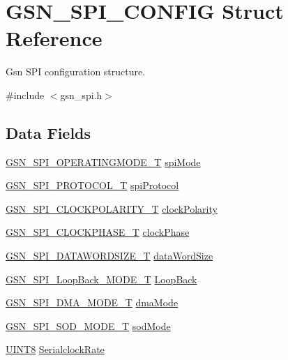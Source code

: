 \hypertarget{a00231}{
\section{GSN\_\-SPI\_\-CONFIG Struct Reference}
\label{a00231}
}


Gsn SPI configuration structure.  




{\ttfamily \#include $<$gsn\_\-spi.h$>$}

\subsection*{Data Fields}
\begin{DoxyCompactItemize}
\item 
\hyperlink{a00655_ga6621383791d81630bc4c294a7a3d292d}{GSN\_\-SPI\_\-OPERATINGMODE\_\-T} \hyperlink{a00231_ab1f5bd9a03dacfe8a653d9cc61bcf820}{spiMode}
\item 
\hyperlink{a00655_gafc404344d5f8c6a8358fa3be07a87444}{GSN\_\-SPI\_\-PROTOCOL\_\-T} \hyperlink{a00231_a2cc829f36d85f4ba9500b54e9a74b0d3}{spiProtocol}
\item 
\hyperlink{a00655_ga40c914db809ec79fd3a564dda8364aea}{GSN\_\-SPI\_\-CLOCKPOLARITY\_\-T} \hyperlink{a00231_a2fcdd63ffc7b77384ef779ac2bc097f3}{clockPolarity}
\item 
\hyperlink{a00655_ga1399b803d30956e8ed6f4929033329ad}{GSN\_\-SPI\_\-CLOCKPHASE\_\-T} \hyperlink{a00231_a3bf64950c4cb62575d5cc62ca7f0c477}{clockPhase}
\item 
\hyperlink{a00655_ga63cbe81427185213bde26b93dde72747}{GSN\_\-SPI\_\-DATAWORDSIZE\_\-T} \hyperlink{a00231_a3998333a3ec939733a315371ea525299}{dataWordSize}
\item 
\hyperlink{a00655_ga6f83091cbd86860cdb531eb6c520660e}{GSN\_\-SPI\_\-LoopBack\_\-MODE\_\-T} \hyperlink{a00231_a82d6f7f94ead0563d493532a0fc8082e}{LoopBack}
\item 
\hyperlink{a00655_gafff743b26bbfafb380a9797457935a0e}{GSN\_\-SPI\_\-DMA\_\-MODE\_\-T} \hyperlink{a00231_a8745e343cad523631d63304871d0bdf3}{dmaMode}
\item 
\hyperlink{a00655_ga5662413f1ff6b81e835e7c5412916d4b}{GSN\_\-SPI\_\-SOD\_\-MODE\_\-T} \hyperlink{a00231_a6988180f451df73a4220e1f4df6c37d9}{sodMode}
\item 
\hyperlink{a00660_gab27e9918b538ce9d8ca692479b375b6a}{UINT8} \hyperlink{a00231_aceb3f680c7de4959ad53b0e20baf8a5c}{SerialclockRate}
\item 

\end{DoxyCompactItemize}
